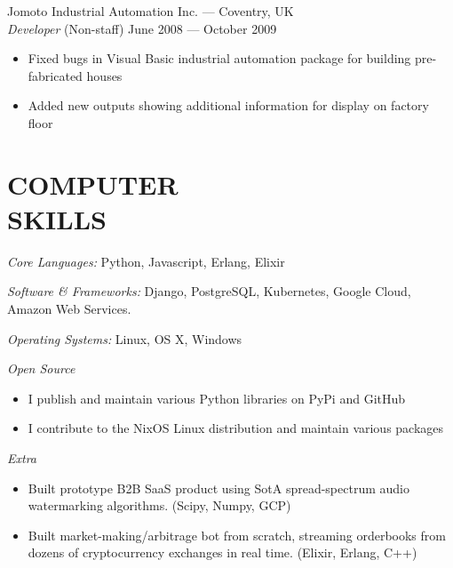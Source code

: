\documentclass[margin, 10pt]{res}
\begin{document}
\begin{resume}
Jomoto Industrial Automation Inc. --- Coventry, UK \\
{\sl Developer} \hfill (Non-staff) June 2008 --- October 2009 \\
\begin{itemize} \itemsep -1pt
\item Fixed bugs in Visual Basic industrial automation package for building pre-fabricated houses
\item Added new outputs showing additional information for display on factory floor
\end{itemize}


\section{COMPUTER \\ SKILLS}

{\sl Core Languages:}
Python, Javascript, Erlang, Elixir

{\sl Software \& Frameworks:}
Django, PostgreSQL, Kubernetes, Google Cloud, Amazon Web Services.

{\sl Operating Systems:} Linux, OS X, Windows

{\sl Open Source}
\begin{itemize}
\item I publish and maintain various Python libraries on PyPi and GitHub
\item I contribute to the NixOS Linux distribution and maintain various packages
\end{itemize}

{\sl Extra}
\begin{itemize}
\item Built prototype B2B SaaS product using SotA spread-spectrum audio watermarking algorithms. (Scipy, Numpy, GCP)
\item Built market-making/arbitrage bot from scratch, streaming orderbooks from dozens of cryptocurrency exchanges in real time. (Elixir, Erlang, C++)
\end{itemize}



\end{resume}
\end{document}
